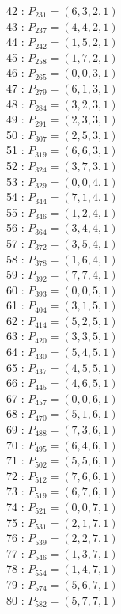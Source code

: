 \documentclass{article}
\begin{document}
{\begin{multicols}{3}
42 : $P_{231}=( 6, 3, 2, 1 )$\\
43 : $P_{237}=( 4, 4, 2, 1 )$\\
44 : $P_{242}=( 1, 5, 2, 1 )$\\
45 : $P_{258}=( 1, 7, 2, 1 )$\\
46 : $P_{265}=( 0, 0, 3, 1 )$\\
47 : $P_{279}=( 6, 1, 3, 1 )$\\
48 : $P_{284}=( 3, 2, 3, 1 )$\\
49 : $P_{291}=( 2, 3, 3, 1 )$\\
50 : $P_{307}=( 2, 5, 3, 1 )$\\
51 : $P_{319}=( 6, 6, 3, 1 )$\\
52 : $P_{324}=( 3, 7, 3, 1 )$\\
53 : $P_{329}=( 0, 0, 4, 1 )$\\
54 : $P_{344}=( 7, 1, 4, 1 )$\\
55 : $P_{346}=( 1, 2, 4, 1 )$\\
56 : $P_{364}=( 3, 4, 4, 1 )$\\
57 : $P_{372}=( 3, 5, 4, 1 )$\\
58 : $P_{378}=( 1, 6, 4, 1 )$\\
59 : $P_{392}=( 7, 7, 4, 1 )$\\
60 : $P_{393}=( 0, 0, 5, 1 )$\\
61 : $P_{404}=( 3, 1, 5, 1 )$\\
62 : $P_{414}=( 5, 2, 5, 1 )$\\
63 : $P_{420}=( 3, 3, 5, 1 )$\\
64 : $P_{430}=( 5, 4, 5, 1 )$\\
65 : $P_{437}=( 4, 5, 5, 1 )$\\
66 : $P_{445}=( 4, 6, 5, 1 )$\\
67 : $P_{457}=( 0, 0, 6, 1 )$\\
68 : $P_{470}=( 5, 1, 6, 1 )$\\
69 : $P_{488}=( 7, 3, 6, 1 )$\\
70 : $P_{495}=( 6, 4, 6, 1 )$\\
71 : $P_{502}=( 5, 5, 6, 1 )$\\
72 : $P_{512}=( 7, 6, 6, 1 )$\\
73 : $P_{519}=( 6, 7, 6, 1 )$\\
74 : $P_{521}=( 0, 0, 7, 1 )$\\
75 : $P_{531}=( 2, 1, 7, 1 )$\\
76 : $P_{539}=( 2, 2, 7, 1 )$\\
77 : $P_{546}=( 1, 3, 7, 1 )$\\
78 : $P_{554}=( 1, 4, 7, 1 )$\\
79 : $P_{574}=( 5, 6, 7, 1 )$\\
80 : $P_{582}=( 5, 7, 7, 1 )$\\
\end{multicols}


}
\end{document}
